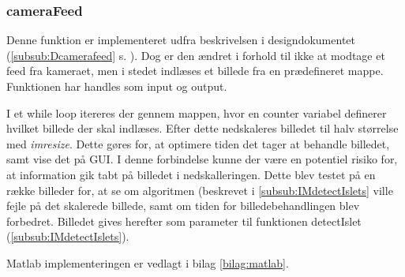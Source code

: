 \subsubsection{cameraFeed} \label{subsub:camfeed}
Denne funktion er implementeret udfra beskrivelsen i designdokumentet (\ref{subsub:Dcamerafeed} s. \pageref{subsub:Dcamerafeed}). Dog er den ændret i forhold til ikke at modtage et feed fra kameraet, men i stedet indlæses et billede fra en prædefineret mappe. 
Funktionen har handles som input og output. 

I et while loop itereres der gennem mappen, hvor en counter variabel definerer hvilket billede der skal indlæses. Efter dette nedskaleres billedet til halv størrelse med \textit{imresize}. Dette gøres for, at optimere tiden det tager at behandle billedet, samt vise det på GUI. I denne forbindelse kunne der være en potentiel risiko for, at information gik tabt på billedet i nedskalleringen. Dette blev testet på en række billeder for, at se om algoritmen (beskrevet i \ref{subsub:IMdetectIslets} ville fejle på det skalerede billede, samt om tiden for billedebehandlingen blev forbedret. Billedet gives herefter som parameter til funktionen detectIslet (\ref{subsub:IMdetectIslets}). %

Matlab implementeringen er vedlagt i bilag \ref{bilag:matlab}.
